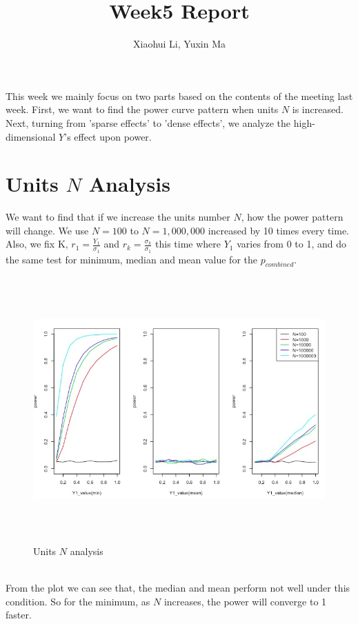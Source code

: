 \documentclass[10pt,english]{article}\usepackage{graphicx, color}
\numberwithin{equation}{section}
\numberwithin{figure}{section}
\begin{document}
\title{Week5 Report}


\author{Xiaohui Li, Yuxin Ma}

\maketitle


This week we mainly focus on two parts based on the contents of the meeting last week. First, we want to find the power curve pattern when units $N$ is increased. Next, turning from 'sparse effects' to 'dense effects',  we analyze the high-dimensional $Y$'s effect upon power.

\section{Units $N$ Analysis}
We want to find that if we increase the units number $N$, how the power pattern will change. We use $N=100$ to $N=1,000,000$ increased by 10 times every time. Also, we fix K, $r_1=\frac{Y_1}{\sigma_1}$ and $r_k=\frac{\sigma_k}{\sigma_1}$ this time where $Y_1$ varies from 0 to 1, and do the same test for minimum, median and mean value for the $p_{combined}$.
\begin{figure}[htbp]
\centering\includegraphics[width=8in, height=4in]{N}
\caption{Units $N$ analysis}
\end{figure}
\quad\\
From the plot we can see that, the median and mean perform not well under this condition. So for the minimum, as $N$ increases, the power will converge to 1 faster.
\end{document}
